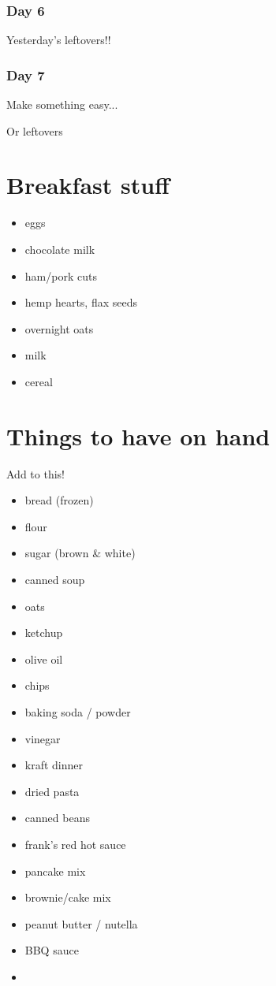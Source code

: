 \documentclass[11pt, a4paper]{article}
\begin{document}
\subsubsection{Day 6}
\vspace{1pc}
Yesterday's leftovers!!

\subsubsection{Day 7}
\vspace{1pc}
\noindent Make something easy...
\par
Or leftovers


\pagebreak
\appendix

\section{Breakfast stuff}

\begin{itemize}
\item eggs
\item chocolate milk
\item ham/pork cuts
\item hemp hearts, flax seeds
\item overnight oats
\item milk
\item cereal
\end{itemize}

\vspace{1pc}

\section{Things to have on hand}
Add to this!

\vspace{1pc}

\begin{itemize}
\item bread (frozen)
\item flour
\item sugar (brown \& white)
\item canned soup
\item oats
\item ketchup
\item olive oil
\item chips
\item baking soda / powder
\item vinegar
\item kraft dinner
\item dried pasta
\item canned beans
\item frank's red hot sauce
\item pancake mix
\item brownie/cake mix
\item peanut butter / nutella
\item BBQ sauce
\item
\end{itemize}
\end{document}
